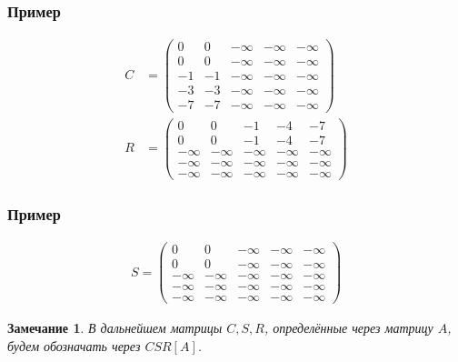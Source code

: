 \documentclass{beamer}
\newtheorem*{Rem}{Замечание}
\begin{document}
\begin{frame}
\frametitle{Пример}
\begin{align*}
   	C &= \begin{pmatrix}
    		 0 &   0 & -\infty & -\infty & -\infty \\
  		 0 &   0 & -\infty & -\infty & -\infty \\
  		-1 &  -1 & -\infty & -\infty & -\infty \\
  		-3 &  -3 & -\infty & -\infty & -\infty \\
  		-7 &  -7 & -\infty & -\infty & -\infty
    \end{pmatrix}
    \\
    R &= \begin{pmatrix}
   0 &   0 &  -1 &  -4 &  -7 \\
   0 &   0 &  -1 &  -4 &  -7 \\
  -\infty &  -\infty & -\infty & -\infty & -\infty \\
  -\infty &  -\infty & -\infty & -\infty & -\infty \\
  -\infty &  -\infty & -\infty & -\infty & -\infty
\end{pmatrix}
\end{align*}
\end{frame}


\begin{frame}
\frametitle{Пример}
\begin{align*}
   S = \begin{pmatrix}
   0 &   0 & -\infty & -\infty & -\infty \\
   0 &   0 & -\infty & -\infty & -\infty \\
  -\infty &  -\infty & -\infty & -\infty & -\infty \\
  -\infty &  -\infty & -\infty & -\infty & -\infty \\
  -\infty & -\infty & -\infty & -\infty & -\infty
\end{pmatrix}
\end{align*}
\begin{Rem}
	В дальнейшем матрицы $C, S, R$, определённые через матрицу $A$, будем обозначать через $CSR[A]$.
\end{Rem}
\end{frame}

\end{document}
